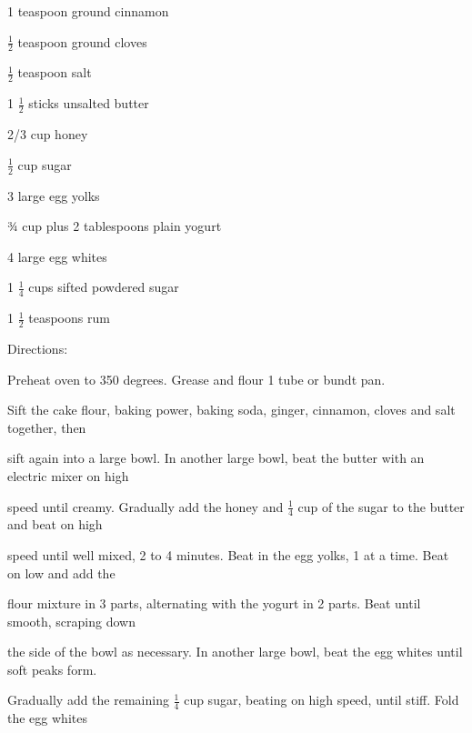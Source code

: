 \documentclass[a4paper,portrait,12pt]{book}
\begin{document}
1 teaspoon ground cinnamon




$\frac{1}{2}$ teaspoon ground cloves




$\frac{1}{2}$ teaspoon salt




1 $\frac{1}{2}$ sticks unsalted butter




2/3 cup honey




$\frac{1}{2}$ cup sugar




3 large egg yolks




¾ cup plus 2 tablespoons plain yogurt




4 large egg whites




1 $\frac{1}{4}$ cups sifted powdered sugar




1 $\frac{1}{2}$ teaspoons rum




Directions:




Preheat oven to 350 degrees. Grease and flour 1 tube or bundt pan.




Sift the cake flour, baking power, baking soda, ginger, cinnamon, cloves and salt together, then




sift again into a large bowl. In another large bowl, beat the butter with an electric mixer on high




speed until creamy. Gradually add the honey and $\frac{1}{4}$ cup of the sugar to the butter and beat on high




speed until well mixed, 2 to 4 minutes. Beat in the egg yolks, 1 at a time. Beat on low and add the




flour mixture in 3 parts, alternating with the yogurt in 2 parts. Beat until smooth, scraping down




the side of the bowl as necessary. In another large bowl, beat the egg whites until soft peaks form.




Gradually add the remaining $\frac{1}{4}$ cup sugar, beating on high speed, until stiff. Fold the egg whites
\end{document}
